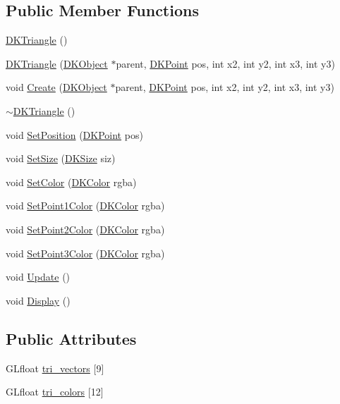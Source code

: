 \subsection*{Public Member Functions}
\begin{DoxyCompactItemize}
\item 
\hyperlink{class_d_k_triangle_a4862f1fda2811e349d5c934d2f4571af}{D\-K\-Triangle} ()
\item 
\hyperlink{class_d_k_triangle_afa153729baea6a69d9a7b0db3ff517c1}{D\-K\-Triangle} (\hyperlink{class_d_k_object}{D\-K\-Object} $\ast$parent, \hyperlink{_d_k_axis_8h_a0ca1f005fbb936f8e7a7f2433591f418}{D\-K\-Point} pos, int x2, int y2, int x3, int y3)
\item 
void \hyperlink{class_d_k_triangle_a23c692403a8a64ebb25908a779d737d4}{Create} (\hyperlink{class_d_k_object}{D\-K\-Object} $\ast$parent, \hyperlink{_d_k_axis_8h_a0ca1f005fbb936f8e7a7f2433591f418}{D\-K\-Point} pos, int x2, int y2, int x3, int y3)
\item 
\hyperlink{class_d_k_triangle_a2704074f106309b136a145bfd29d4544}{$\sim$\-D\-K\-Triangle} ()
\item 
void \hyperlink{class_d_k_triangle_abb11299d049ab10bdf5c2471e954dbed}{Set\-Position} (\hyperlink{_d_k_axis_8h_a0ca1f005fbb936f8e7a7f2433591f418}{D\-K\-Point} pos)
\item 
void \hyperlink{class_d_k_triangle_af8058bcd37ec959c4d36c11f3001eec6}{Set\-Size} (\hyperlink{_d_k_axis_8h_aaa25a8c7cbf504fffdb8a4208ff7a731}{D\-K\-Size} siz)
\item 
void \hyperlink{class_d_k_triangle_ae4a3cbd708cce3ab323d4208ea823e7e}{Set\-Color} (\hyperlink{class_d_k_color}{D\-K\-Color} rgba)
\item 
void \hyperlink{class_d_k_triangle_a409884000c318e3d30f43d05ca6aec23}{Set\-Point1\-Color} (\hyperlink{class_d_k_color}{D\-K\-Color} rgba)
\item 
void \hyperlink{class_d_k_triangle_a5b012f7d4a84dbd6f95f23a1d3ea1272}{Set\-Point2\-Color} (\hyperlink{class_d_k_color}{D\-K\-Color} rgba)
\item 
void \hyperlink{class_d_k_triangle_af9b124dc17e793c887b03223fcbe970a}{Set\-Point3\-Color} (\hyperlink{class_d_k_color}{D\-K\-Color} rgba)
\item 
void \hyperlink{class_d_k_triangle_a194b17d09eabee8a1f9adf8305954d21}{Update} ()
\item 
void \hyperlink{class_d_k_triangle_a37ecd5b04876624c258ed00ca233e9e3}{Display} ()
\end{DoxyCompactItemize}
\subsection*{Public Attributes}
\begin{DoxyCompactItemize}
\item 
G\-Lfloat \hyperlink{class_d_k_triangle_a4210cbe05280123f2e37f4bb59f11b79}{tri\-\_\-vectors} \mbox{[}9\mbox{]}
\item 
G\-Lfloat \hyperlink{class_d_k_triangle_a309d86ab6d3e5801e596f36ddb64a351}{tri\-\_\-colors} \mbox{[}12\mbox{]}
\end{DoxyCompactItemize}
